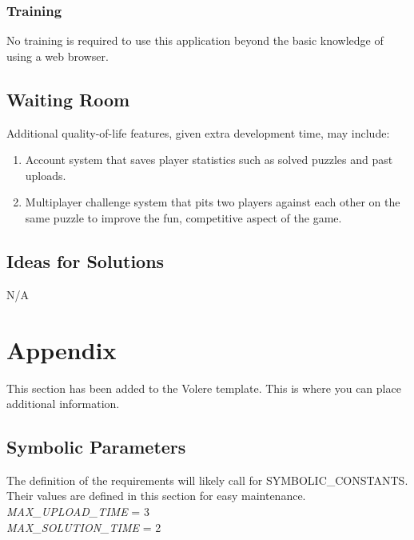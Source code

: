 \documentclass[11pt]{article}
\begin{document}
\subsubsection{Training}
No training is required to use this application beyond the basic knowledge of using a web browser.

\subsection{Waiting Room}
Additional quality-of-life features, given extra development time, may include:
\begin{enumerate}
    \item Account system that saves player statistics such as solved puzzles and past uploads.
    \item Multiplayer challenge system that pits two players against each other on the same puzzle to improve the fun, competitive aspect of the game.
\end{enumerate}


\subsection{Ideas for Solutions}
N/A





\newpage

\section{Appendix}

This section has been added to the Volere template.  This is where you can place
additional information.

\subsection{Symbolic Parameters}

The definition of the requirements will likely call for SYMBOLIC\_CONSTANTS.
Their values are defined in this section for easy maintenance.\\

\noindent \emph{MAX\_UPLOAD\_TIME} = 3\\
\emph{MAX\_SOLUTION\_TIME} = 2
\end{document}
